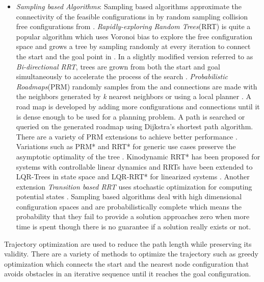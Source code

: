 \begin{itemize}
\item \textit{Sampling based Algorithms}: Sampling based algorithms approximate the connectivity of the feasible configurations in \CSfree{} by random sampling collision free configurations from \CS{} \cite{hudson1997v,gottschalk1996obbtree,hsu1997path}. \textit{Rapidly-exploring Random Trees}(RRT) is quite a popular algorithm which uses Voronoi bias to explore the free configuration space and grows a tree by sampling randomly at every iteration to connect the start and the goal point in \CSfree{}. In a slightly modified version referred to as \textit{Bi-directional RRT}, trees are grown from both the start and goal simultaneously to accelerate the process of the search \cite{kuffner2000rrt}. \textit{Probabilistic Roadmaps}(PRM) randomly samples from the \CS{} and connections are made with the neighbors generated by \textit{k} nearest neighbors or using a local planner \cite{karaman2011sampling}. A road map is developed by adding more configurations and connections until it is dense enough to be used for a planning problem. A path is searched or queried on the generated roadmap using Dijkstra's shortest path algorithm. There are a variety of PRM extensions to achieve better performance \cite{geraerts2004comparative}. Variations such as PRM* and RRT* for generic use cases preserve the asymptotic optimality of the tree \cite{karaman2011sampling}. Kinodynamic RRT* has been proposed for systems with controllable linear dynamics \cite{webb2013kinodynamic} and RRTs have been extended to LQR-Trees in state space \cite{tedrake2010lqr} and LQR-RRT* for linearized systems \cite{perez2012lqr}. Another extension \textit{Transition based RRT} uses stochastic optimization for computing potential states \cite{jaillet2008transition}. Sampling based algorithms deal with high dimensional configuration spaces and are probabilistically complete which means the probability that they fail to provide a solution approaches zero when more time is spent though there is no guarantee if a solution really exists or not.
\end{itemize}


Trajectory optimization are used to reduce the path length while preserving its validity. There are a variety of methods to optimize the trajectory such as greedy optimization \cite{thrun2002probabilistic}  which connects the start and the nearest node configuration that avoids obstacles in an iterative sequence until it reaches the goal configuration. 



